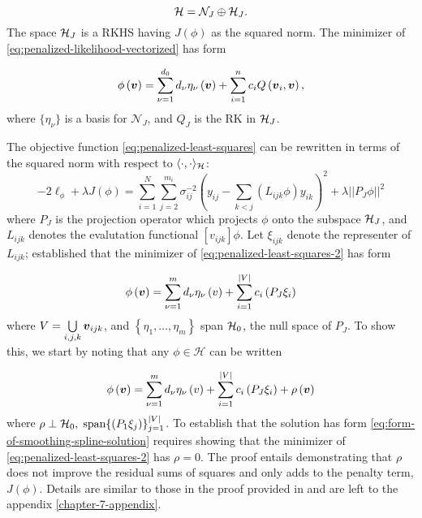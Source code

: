 \[
\mathcal{H} = \mathcal{N}_J \oplus \mathcal{H}_J.
\]
\noindent
The space $\mathcal{H}_J$ is a RKHS having $J\left(\phi\right)$ as the squared norm. The minimizer of \ref{eq:penalized-likelihood-vectorized} has form 

\begin{equation} \label{eq:RKHS-functional-form}
\phi\left(\mbox{\boldmath $v$}\right) = \sum_{\nu = 1}^{d_0} d_\nu \eta_\nu\left( \mbox{\boldmath $v$} \right) + \sum_{i=1}^n c_i Q\left(\mbox{\boldmath $v$}_i, \mbox{\boldmath $v$} \right),
\end{equation} 
\bigskip
\noindent
where $\lbrace \eta_\nu \rbrace$ is a basis for $\mathcal{N}_J$, and $Q_J$ is the RK in $\mathcal{H}_J$. 

\bigskip


The objective function \ref{eq:penalized-least-squares} can be rewritten in terms of the squared norm with respect to $\langle\cdot,\cdot\rangle_{\mathcal{H}}$:
\begin{equation} \label{eq:penalized-least-squares-2}
-2\ell_\phi + \lambda J\left(\phi\right) = \sum_{i=1}^N \sum_{j=2}^{m_i} \sigma^{-2}_{ij}\left( y_{ij} - \sum_{k<j}\left( L_{ijk}\phi\right) y_{ik}  \right)^2 + \lambda \vert\vert P_J \phi \vert \vert^2
\end{equation}
\noindent
where $P_J$ is the projection operator which projects $\phi$ onto the subspace $\mathcal{H}_J$, and $L_{ijk}$ denotes the evalutation functional $\left[v_{ijk}\right] \phi$. Let $\xi_{ijk}$ denote the representer of $L_{ijk}$; \citet{kimeldorf1971some} established that the minimizer of \ref{eq:penalized-least-squares-2} has form

\begin{equation} \label{eq:form-of-smoothing-spline-solution}
\phi\left( \mbox{\boldmath $v$} \right) = \sum_{\nu=1}^{m} d_\nu \eta_\nu \left( v \right) + \sum_{i = 1}^{\vert V \vert} c_{i}\left(P_J \xi_i \right)
\end{equation}
\noindent
where $V = \bigcup\limits_{i,j,k} \mbox{\boldmath $v$}_{ijk}$, and $\left\{\eta_1,\dots, \eta_{m}\right\}$ span $\mathcal{H}_0$, the null space of $P_J$. To show this, we start by noting that any $\phi \in \mathcal{H}$ can be written 

\begin{equation} \label{eq:smoothing-spline-representer-expansion-1}
\phi\left( \mbox{\boldmath $v$} \right) = \sum_{\nu=1}^{m} d_\nu \eta_\nu \left( v \right) + \sum_{i = 1}^{\vert V \vert} c_{i}\left(P_J \xi_i \right) + \rho\left(\mbox{\boldmath $v$}\right)
\end{equation}
\noindent
where $\rho \perp \mathcal{H}_0,\; \textup{span}\lbrace \left(P_1 \xi_{j} \right) \rbrace_{j = 1}^{\vert V\vert}$. To establish that the solution has form \ref{eq:form-of-smoothing-spline-solution} requires showing that the minimizer of \ref{eq:penalized-least-squares-2} has $\rho = 0$. The proof entails demonstrating that $\rho$ does not improve the residual sums of squares and only adds to the penalty term, $J\left(\phi\right)$. Details are similar to those in the proof provided in \citet{wahba1990spline} and are left to the appendix \ref{chapter-7-appendix}.



